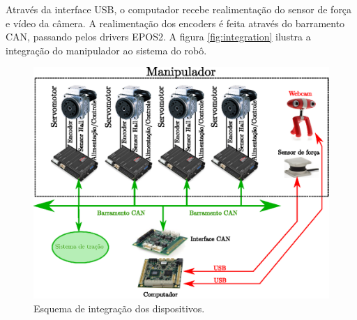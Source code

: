 Através da interface USB, o computador recebe realimentação do sensor de força e vídeo da câmera. A realimentação dos encoders é feita através do barramento CAN, passando pelos drivers EPOS2. A figura \ref{fig:integration} ilustra a integração do manipulador ao sistema do robô.

\begin{figure}[!ht]
\centering
  \includegraphics[width=\linewidth]{./img/integration_diagram}
  \caption{Esquema de integração dos dispositivos.}
  \label{fig:optoforce}
\end{figure}%